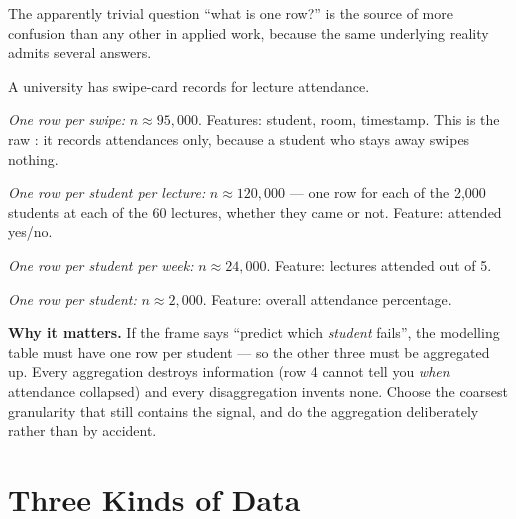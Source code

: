 The apparently trivial question ``what is one row?'' is the source of more
confusion than any other in applied work, because the same underlying reality
admits several answers.

\begin{worked}
A university has swipe-card records for lecture attendance.

\begin{tight}
  \item \emph{One row per swipe:} $n \approx 95{,}000$. Features: student, room,
        timestamp. This is the raw : it records attendances
        only, because a student who stays away swipes nothing.
  \item \emph{One row per student per lecture:} $n \approx 120{,}000$ --- one row
        for each of the 2{,}000 students at each of the 60 lectures, whether they
        came or not. Feature: attended yes/no.
  \item \emph{One row per student per week:} $n \approx 24{,}000$. Feature:
        lectures attended out of 5.
  \item \emph{One row per student:} $n \approx 2{,}000$. Feature: overall
        attendance percentage.
\end{tight}

\textbf{Why it matters.} If the frame says ``predict which \emph{student} fails'',
the modelling table must have one row per student --- so the other three must be
aggregated up. Every aggregation destroys information (row 4 cannot tell you
\emph{when} attendance collapsed) and every disaggregation invents none. Choose
the coarsest granularity that still contains the signal, and do the aggregation
deliberately rather than by accident.
\end{worked}

\section{Three Kinds of Data}

